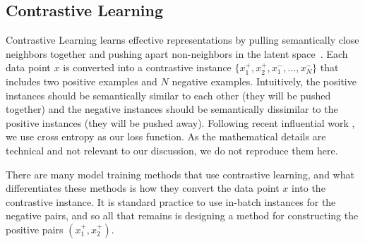\documentclass[11pt]{article}
\begin{document}
\subsection{Contrastive Learning}
Contrastive Learning learns effective representations by pulling semantically close neighbors together and pushing apart non-neighbors in the latent space~\cite{Hadsell2006DimensionalityRB}.
Each data point $x$ is converted into a contrastive instance $\{x^{+}_1, x^{+}_2, x_1^{-},\dots,x_{N}^{-}\}$ that includes two positive examples and $N$ negative examples.
Intuitively, the positive instances should be semantically similar to each other (they will be pushed together) and the negative instances should be semantically dissimilar to the positive instances (they will be pushed away).
Following recent influential work \cite{Chen2020ASF,Gao2021SimCSESC,Li2022UCTopicUC}, we use cross entropy as our loss function.
As the mathematical details are technical and not relevant to our discussion,
we do not reproduce them here.
%

There are many model training methods that use contrastive learning, and what differentiates these methods is how they convert the data point $x$ into the contrastive instance.
It is standard practice to use in-batch instances for the negative pairs,
and so all that remains is designing a method for constructing the positive pairs $(x_1^+, x_2^+)$.
\end{document}
